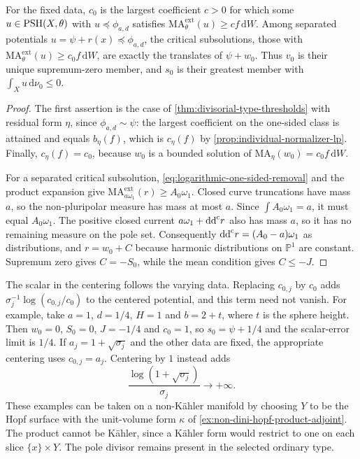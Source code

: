 \begin{corollary}\label{cor:logarithmic-critical-order}
For the fixed data, $c_0$ is the largest coefficient $c>0$ for which some $u\in\mathrm{PSH}(X,\theta)$ with $u\preceq\phi_{a,d}$ satisfies $\mathrm{MA}^{\mathrm{ext}}_\theta(u)\geq c f\,\mathrm{d}W$. Among separated potentials $u=\psi+r(x)\preceq\phi_{a,d}$, the critical subsolutions, those with $\mathrm{MA}^{\mathrm{ext}}_\theta(u)\geq c_0f\,\mathrm{d}W$, are exactly the translates of $\psi+w_0$. Thus $v_0$ is their unique supremum-zero member, and $s_0$ is their greatest member with $\int_Xu\,\mathrm{d}\nu_0\leq0$.
\end{corollary}
\begin{proof}
The first assertion is the case of \cref{thm:divisorial-type-thresholds} with residual form $\eta$, since $\phi_{a,d}\sim\psi$: the largest coefficient on the one-sided class is attained and equals $b_\eta(f)$, which is $c_\eta(f)$ by \cref{prop:individual-normalizer-lp}. Finally, $c_\eta(f)=c_0$, because $w_0$ is a bounded solution of $\mathrm{MA}_\eta(w_0)=c_0f\,\mathrm{d}W$.

For a separated critical subsolution, \eqref{eq:logarithmic-one-sided-removal} and the product expansion give $\mathrm{MA}^{\mathrm{ext}}_{a\omega_1}(r)\geq A_0\omega_1$. Closed curve truncations have mass $a$, so the non-pluripolar measure has mass at most $a$. Since $\int A_0\omega_1=a$, it must equal $A_0\omega_1$. The positive closed current $a\omega_1+\mathrm{dd}^{\mathrm{c}} r$ also has mass $a$, so it has no remaining measure on the pole set. Consequently $\mathrm{dd}^{\mathrm{c}} r=(A_0-a)\omega_1$ as distributions, and $r=w_0+C$ because harmonic distributions on $\mathbb P^1$ are constant. Supremum zero gives $C=-S_0$, while the mean condition gives $C\leq-J$.
\end{proof}

The scalar in the centering follows the varying data. Replacing $c_{0,j}$ by $c_0$ adds $\sigma_j^{-1}\log(c_{0,j}/c_0)$ to the centered potential, and this term need not vanish. For example, take $a=1$, $d=1/4$, $H=1$ and $b=2+t$, where $t$ is the sphere height. Then $w_0=0$, $S_0=0$, $J=-1/4$ and $c_0=1$, so $s_0=\psi+1/4$ and the scalar-error limit is $1/4$. If $a_j=1+\sqrt{\sigma_j}$ and the other data are fixed, the appropriate centering uses $c_{0,j}=a_j$. Centering by $1$ instead adds
\[
 \frac{\log(1+\sqrt{\sigma_j})}{\sigma_j}\longrightarrow+\infty.
\]
These examples can be taken on a non-K\"ahler manifold by choosing $Y$ to be the Hopf surface with the unit-volume form $\kappa$ of \cref{ex:non-dini-hopf-product-adjoint}. The product cannot be K\"ahler, since a K\"ahler form would restrict to one on each slice $\{x\}\times Y$. The pole divisor remains present in the selected ordinary type.



